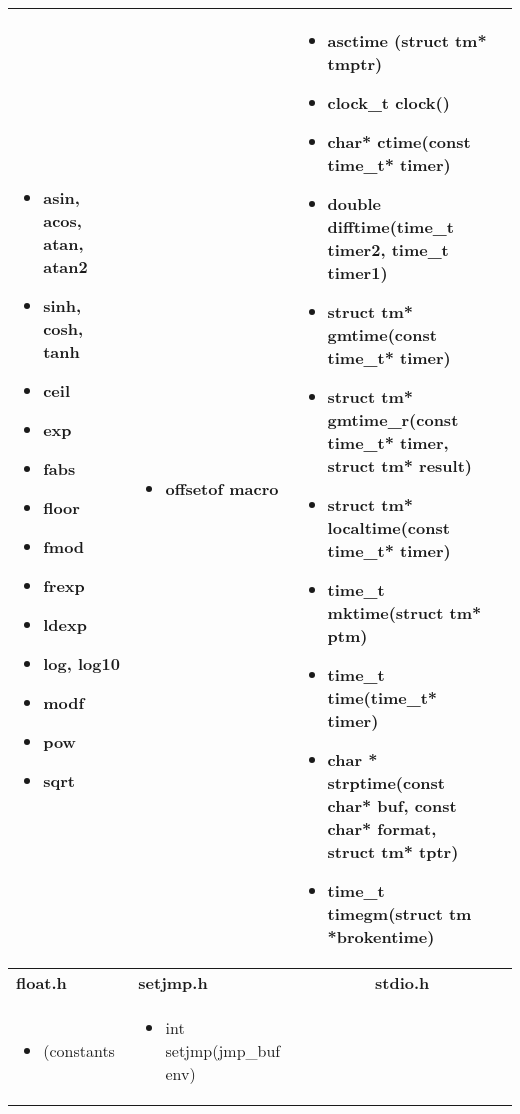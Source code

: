 \begin{table*}[h]
\begin{tabular}{|p{3cm}|p{3cm}|p{3cm}|p{6.5cm}|}
\begin{itemize}
	\item asin, acos, atan, atan2
	\item sinh, cosh, tanh
	\item ceil
	\item exp
	\item fabs
	\item floor
	\item fmod
	\item frexp
	\item ldexp
	\item log, log10
	\item modf
	\item pow
	\item sqrt
\end{itemize}
 &  \begin{itemize}
	\item offsetof macro
\end{itemize}
 &  \begin{itemize}
\setlength{\itemsep}{0cm}
\setlength{\parskip}{0cm}
	\item asctime (struct tm* tmptr)
	\item clock\_t clock()
	\item char* ctime(const time\_t* timer)
	\item double difftime(time\_t timer2, time\_t timer1)
	\item struct tm* gmtime(const time\_t* timer)
	\item struct tm* gmtime\_r(const time\_t* timer, struct tm* result)
	\item struct tm* localtime(const time\_t* timer)
	\item time\_t mktime(struct tm* ptm)
	\item time\_t time(time\_t* timer)
	\item char * strptime(const char* buf, const char* format, struct tm* tptr)
	\item time\_t timegm(struct tm *brokentime)
\end{itemize}
 \\ \hline
		\textbf{ float.h} & \textbf{ setjmp.h} & \multicolumn{2}{|c|}{\textbf{ stdio.h}} \\ \hline
		 \begin{itemize}
	\item (constants
\end{itemize}
 &  \begin{itemize}
\setlength{\itemsep}{0cm}
\setlength{\parskip}{0cm}
	\item int setjmp(jmp\_buf env)

\end{itemize}
\end{tabular}
\end{table*}
